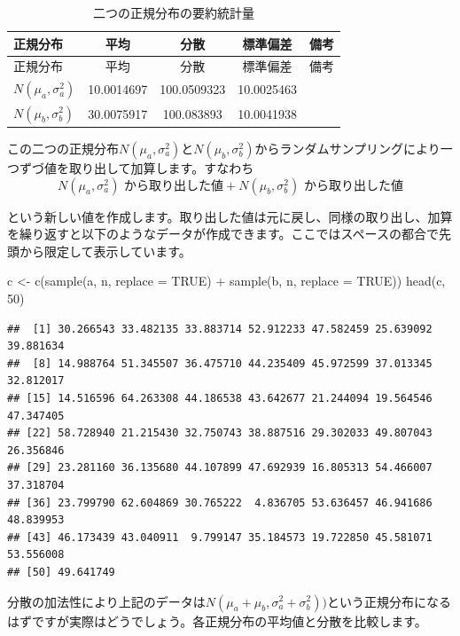 \documentclass[]{tufte-handout}
\newenvironment{Shaded}{}{}
\newcommand{\AttributeTok}[1]{\textcolor[rgb]{0.49,0.56,0.16}{#1}}
\newcommand{\ConstantTok}[1]{\textcolor[rgb]{0.53,0.00,0.00}{#1}}
\newcommand{\DecValTok}[1]{\textcolor[rgb]{0.25,0.63,0.44}{#1}}
\newcommand{\FunctionTok}[1]{\textcolor[rgb]{0.02,0.16,0.49}{#1}}
\newcommand{\NormalTok}[1]{#1}
\newcommand{\OtherTok}[1]{\textcolor[rgb]{0.00,0.44,0.13}{#1}}
\newcommand{\SpecialCharTok}[1]{\textcolor[rgb]{0.25,0.44,0.63}{#1}}
\begin{document}
\begin{longtable}[]{@{}lcccl@{}}
\caption{二つの正規分布の要約統計量}\tabularnewline
\toprule
正規分布 & 平均 & 分散 & 標準偏差 & 備考 \\
\midrule
\endfirsthead
\toprule
正規分布 & 平均 & 分散 & 標準偏差 & 備考 \\
\midrule
\endhead
\(N(\mu_a, \sigma^2_a)\) & 10.0014697 & 100.0509323 & 10.0025463 & \\
\(N(\mu_b, \sigma^2_b)\) & 30.0075917 & 100.083893 & 10.0041938 & \\
\bottomrule
\end{longtable}

この二つの正規分布\(N(\mu_a, \sigma^2_a)\)と\(N(\mu_b,\sigma^2_b)\)からランダムサンプリングにより一つずづ値を取り出して加算します。すなわち
　
\[N(\mu_a, \sigma^2_a)\mbox{ から取り出した値} + N(\mu_b,\sigma^2_b)\mbox{ から取り出した値}\]

という新しい値を作成します。取り出した値は元に戻し、同様の取り出し、加算を繰り返すと以下のようなデータが作成できます。ここではスペースの都合で先頭から限定して表示しています。

\begin{Shaded}
\begin{Highlighting}[numbers=left,,]
\NormalTok{c }\OtherTok{\textless{}{-}} \FunctionTok{c}\NormalTok{(}\FunctionTok{sample}\NormalTok{(a, n, }\AttributeTok{replace =} \ConstantTok{TRUE}\NormalTok{) }\SpecialCharTok{+} \FunctionTok{sample}\NormalTok{(b, n, }\AttributeTok{replace =} \ConstantTok{TRUE}\NormalTok{))}
\FunctionTok{head}\NormalTok{(c, }\DecValTok{50}\NormalTok{)}
\end{Highlighting}
\end{Shaded}

\begin{verbatim}
##  [1] 30.266543 33.482135 33.883714 52.912233 47.582459 25.639092 39.881634
##  [8] 14.988764 51.345507 36.475710 44.235409 45.972599 37.013345 32.812017
## [15] 14.516596 64.263308 44.186538 43.642677 21.244094 19.564546 47.347405
## [22] 58.728940 21.215430 32.750743 38.887516 29.302033 49.807043 26.356846
## [29] 23.281160 36.135680 44.107899 47.692939 16.805313 54.466007 37.318704
## [36] 23.799790 62.604869 30.765222  4.836705 53.636457 46.941686 48.839953
## [43] 46.173439 43.040911  9.799147 35.184573 19.722850 45.581071 53.556008
## [50] 49.641749
\end{verbatim}

分散の加法性により上記のデータは\(N(\mu_a + \mu_b, \sigma^2_a + \sigma^2_b))\)という正規分布になるはずですが実際はどうでしょう。各正規分布の平均値と分散を比較します。
\end{document}
